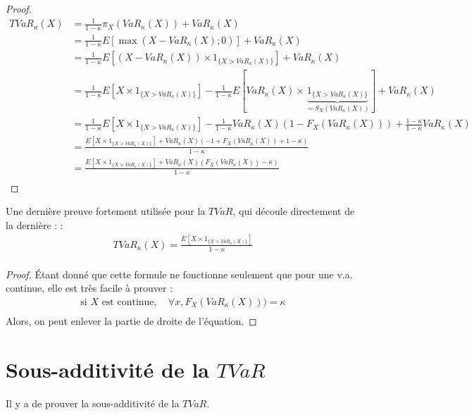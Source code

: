 \begin{proof}
\begin{align*}
TVaR_\kappa(X)  & = \frac{1}{1 - \kappa} \pi_X(VaR_\kappa(X)) + VaR_\kappa(X) \\
    & = \frac{1}{1 - \kappa} E[\max(X - VaR_\kappa(X); 0)] + VaR_\kappa(X) \\
    & = \frac{1}{1 - \kappa} E[(X - VaR_\kappa(X)) \times 1_{\{X > VaR_\kappa(X) \}}] + VaR_\kappa(X) \\
    & = \frac{1}{1 - \kappa} E[X \times 1_{\{X > VaR_\kappa(X) \}}] - \frac{1}{1 - \kappa} E[VaR_\kappa(X) \times \underbrace{1_{\{X > VaR_\kappa(X) \}}}_{= S_X(VaR_\kappa(X))}] + VaR_\kappa(X) \\
    & = \frac{1}{1 - \kappa} E[X \times 1_{\{X > VaR_\kappa(X) \}}] - \frac{1}{1 - \kappa} VaR_\kappa(X)(1 - F_X(VaR_\kappa(X))) + \frac{1 - \kappa}{1 - \kappa}VaR_\kappa(X) \\
    & = \frac{E[X \times 1_{\{X > VaR_\kappa(X) \}}] + VaR_\kappa(X)(-1 + F_X(VaR_\kappa(X)) + 1 - \kappa)}{1 - \kappa}  \\
    & = \frac{E[X \times 1_{\{X > VaR_\kappa(X) \}}] + VaR_\kappa(X)(F_X(VaR_\kappa(X)) - \kappa)}{1 - \kappa}  \\
\end{align*}
\end{proof}

Une dernière preuve fortement utilisée pour la $TVaR$, qui découle directement de la dernière :  : 
\begin{align*}
TVaR_\kappa(X) = \frac{E[X \times 1_{\{X > VaR_\kappa(X) \}}]}{1 - \kappa}  \\
\end{align*}


\begin{proof}
Étant donné que cette formule ne fonctionne seulement que pour une v.a. continue, elle est très facile à prouver : 
\begin{align*}
\text{si $X$ est continue}, \quad \forall x, F_X(VaR_\kappa(X))) = \kappa \\
\end{align*}
Alors, on peut enlever la partie de droite de l'équation.
\end{proof}

\section{Sous-additivité de la $TVaR$}
\label{preuve:subadditivity_tvar}
Il y a  de prouver la sous-additivité de la $TVaR$.

